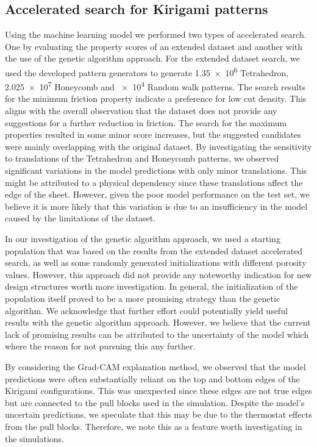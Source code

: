 \subsection{Accelerated search for Kirigami patterns}
Using the machine learning model we performed two types of accelerated search. One
by evaluating the property scores of an extended dataset and another with the
use of the genetic algorithm approach. For the extended dataset search, we used
the developed pattern generators to generate \num{1.35e6} Tetrahedron,
\num{2.025e7} Honeycomb and \num{e4} Random walk patterns. The search results
for the minimum friction property indicate a preference for low cut density. This aligns with the overall observation that the dataset does not
provide any suggestions for a further reduction in friction. The search for the maximum properties resulted in some minor score increases, but
the suggested candidates were mainly overlapping with the original dataset. By investigating the sensitivity to translations of the Tetrahedron and Honeycomb patterns, we observed significant variations in the model predictions with only minor translations. This might be attributed to a physical dependency since these translations affect the edge of the sheet. However, given the poor model performance on the test set, we believe it is more likely that this variation is due to an insufficiency in the model caused by the limitations of the dataset.

In our investigation of the genetic algorithm approach, we used a starting population that was based on the results from the extended dataset accelerated search, as well as some randomly generated initializations with different porosity values. However, this approach did not provide any noteworthy
indication for new design structures worth more investigation. In general, the
initialization of the population itself proved to be a more promising strategy
than the genetic algorithm. We acknowledge that further effort could potentially yield useful results with the genetic algorithm approach. However, we believe that the current lack of promising results can be attributed to the uncertainty of the model which where the reason for not pursuing this any further.

By considering the Grad-CAM explanation method, we observed that the model predictions were often substantially reliant on the top and bottom edges of the Kirigami configurations. This was unexpected since these edges are not true edges but are connected to the pull blocks used in the simulation. Despite the model's uncertain predictions, we speculate that this may be due to the thermostat effects from the pull blocks. Therefore, we note this as a feature worth investigating in the simulations.


